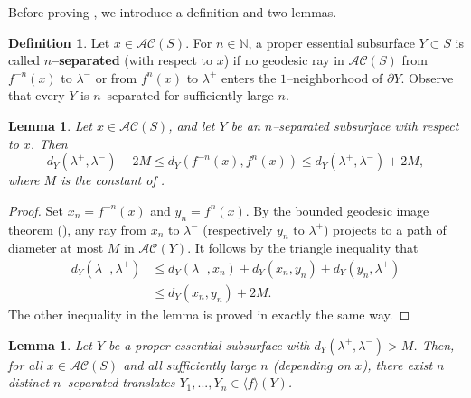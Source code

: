 \documentclass[11pt,letterpaper]{amsart}
\newcommand{\NN}[0]{\mathbb{N}}
\newcommand{\bdy}{\partial} %
\numberwithin{equation}{section}
\newtheorem{lemma}[theorem]{Lemma}
\theoremstyle{definition}
\newtheorem{definition}[theorem]{Definition}
\newcommand{\define}[1]{\textbf{#1}}
\newcommand{\AC}{\mathcal{AC}}
\begin{document}
Before proving , we introduce a definition and two lemmas.

\begin{definition}\label{Def:NSeparated}
Let $x \in \AC(S)$. For $n \in \NN$, a proper essential subsurface $Y \subset S$ is called \define{$n$--separated} (with respect to $x$) if no geodesic ray in $\AC(S)$ from $f^{-n}(x)$ to $\lambda^{-}$ or from $f^n(x)$ to $\lambda^{+}$ enters the $1$--neighborhood of $\bdy Y$. Observe that every $Y$ is $n$--separated for sufficiently large $n$.
\end{definition}

\begin{lemma}\label{Lem:NSeparatedDist}
Let $x \in \AC(S)$, and let $Y$ be an $n$--separated subsurface with respect to $x$. Then 
\[
d_Y(\lambda^+,\lambda^-) - 2M \leq d_Y(f^{-n}(x), f^{n}(x)) \leq d_Y(\lambda^+,\lambda^-) + 2M, 
\]
where $M$ is the constant of .
\end{lemma}

\begin{proof}
Set $x_n = f^{-n}(x)$ and $y_n = f^n(x)$.
By the bounded geodesic image theorem (), any ray from $x_{n}$ to $\lambda^{-}$ (respectively $y_{n}$ to $\lambda^{+}$) projects to a path of diameter at most $M$ in $\mathcal{AC}(Y)$. It follows by the triangle inequality that 
\begin{align*}
d_{Y}(\lambda^{-}, \lambda^{+}) &\leq d_{Y}(\lambda^{-}, x_{n}) + d_{Y}(x_{n}, y_{n}) + d_{Y}(y_{n}, \lambda^{+})\\
&\le d_{Y}(x_{n}, y_{n}) + 2M.
\end{align*}
The other inequality in the lemma is proved in exactly the same way.
\end{proof}

\begin{lemma}\label{Lem:NSeparatedCount}
Let $Y$ be a proper essential subsurface with $d_Y(\lambda^+, \lambda^-) > M$. Then, for all $x \in \AC(S)$ and all sufficiently large $n$ (depending on $x$), there exist $n$ distinct $n$--separated translates $Y_{1},..., Y_{n} \in \langle f \rangle (Y)$.
\end{lemma}
\end{document}

